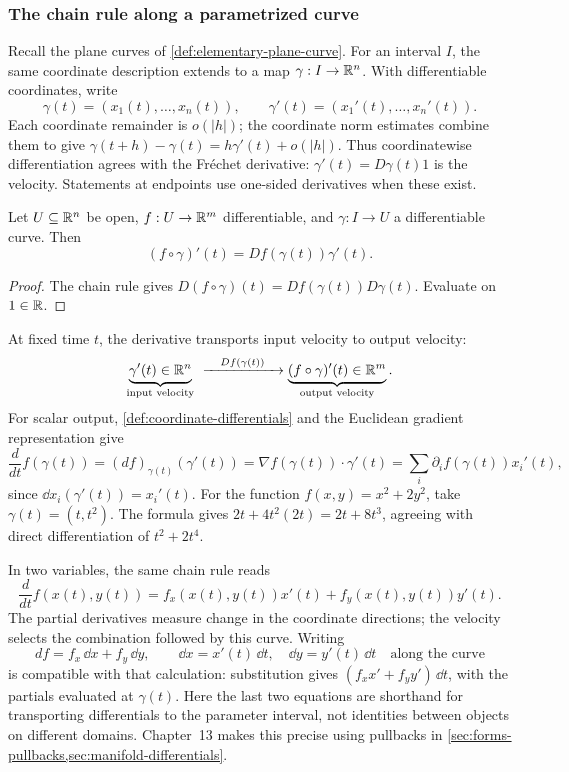 \subsubsection*{The chain rule along a parametrized curve}
\begin{definition}\label{def:curve-velocity}
Recall the plane curves of \cref{def:elementary-plane-curve}.
For an interval $I$, the same coordinate description extends to a map
$\gamma:I\to\mathbb{R}^n$. With differentiable coordinates, write
\[
\gamma(t)=(x_1(t),\ldots,x_n(t)),\qquad
\gamma'(t)=(x_1'(t),\ldots,x_n'(t)).
\]
Each coordinate remainder is $o(|h|)$; the coordinate norm estimates
combine them to give $\gamma(t+h)-\gamma(t)=h\gamma'(t)+o(|h|)$.
Thus coordinatewise differentiation agrees with the Fr\'echet derivative:
$\gamma'(t)=D\gamma(t)1$ is the velocity. Statements at endpoints
use one-sided derivatives when these exist.
\end{definition}
\begin{proposition}\label{prop:curve-chain-rule}
Let $U\subseteq\mathbb{R}^n$ be open, $f:U\to\mathbb{R}^m$ differentiable, and
$\gamma:I\to U$ a differentiable curve. Then
\[
(f\circ\gamma)'(t)=Df(\gamma(t))\gamma'(t).
\]
\end{proposition}
\begin{proof}
The chain rule gives $D(f\circ\gamma)(t)=Df(\gamma(t))D\gamma(t)$.
Evaluate on $1\in\mathbb{R}$.
\end{proof}
At fixed time $t$, the derivative transports input velocity to output velocity:
\[
\underbrace{\gamma'(t)\in\mathbb{R}^n}_{\text{input velocity}}
\ \xrightarrow{\quad Df(\gamma(t))\quad}
\underbrace{(f\circ\gamma)'(t)\in\mathbb{R}^m}_{\text{output velocity}}.
\]
For scalar output, \cref{def:coordinate-differentials} and the Euclidean
gradient representation give
\[
\frac{d}{dt}f(\gamma(t))
=(df)_{\gamma(t)}(\gamma'(t))
=\nabla f(\gamma(t))\cdot\gamma'(t)
=\sum_i\partial_i f(\gamma(t))x_i'(t),
\]
since $\dd x_i(\gamma'(t))=x_i'(t)$. For the function $f(x,y)=x^2+2y^2$, take $\gamma(t)=(t,t^2)$.
The formula gives $2t+4t^2(2t)=2t+8t^3$, agreeing with direct
differentiation of $t^2+2t^4$.

In two variables, the same chain rule reads
\[
\frac{d}{dt}f(x(t),y(t))
=f_x(x(t),y(t))x'(t)+f_y(x(t),y(t))y'(t).
\]
The partial derivatives measure change in the coordinate directions;
the velocity selects the combination followed by this curve. Writing
\[
df=f_x\,\dd x+f_y\,\dd y,\qquad
\dd x=x'(t)\,\dd t,\quad \dd y=y'(t)\,\dd t
\quad\text{along the curve}
\]
is compatible with that calculation: substitution gives
$(f_xx'+f_yy')\,\dd t$, with the partials evaluated at $\gamma(t)$.
Here the last two equations are shorthand for transporting differentials
to the parameter interval, not identities between objects on different
domains. Chapter~13 makes this precise using pullbacks in
\cref{sec:forms-pullbacks,sec:manifold-differentials}.

